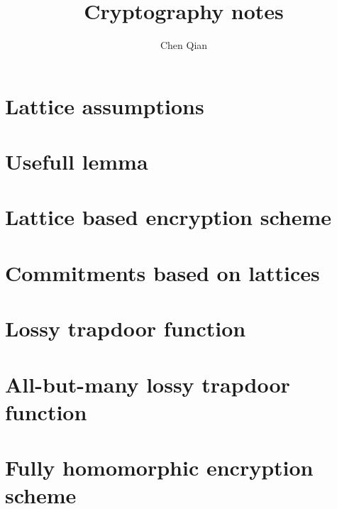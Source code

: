 \documentclass[10pt]{book}
\begin{document}
\pagestyle{plain}



\title{Cryptography notes}

\author{Chen Qian}


\maketitle

\tableofcontents



\chapter{Lattice assumptions}


\chapter{Usefull lemma}


\chapter{Lattice based encryption scheme }


\chapter{Commitments based on lattices}


%

\chapter{Lossy trapdoor function}


\chapter{All-but-many lossy trapdoor function}


\chapter{Fully homomorphic encryption scheme}

\end{document}
